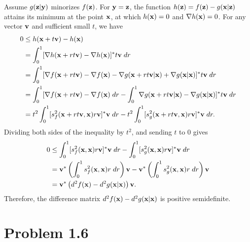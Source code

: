 \documentclass{scrartcl}
\begin{document}
Assume $g(\mathbf{z}|\mathbf{y})$ minorizes $f(\mathbf{z})$. For $\mathbf{y}=\mathbf{z}$, the
function $h(\mathbf{z})=f(\mathbf{z})-g(\mathbf{x}|\mathbf{z})$ attains its minimum at the
point $\mathbf{x}$, at which $h(\mathbf{x})=0$ and $\nabla h(\mathbf{x}) = 0$.
For any vector $\mathbf{v}$ and sufficient small $t$, we have
\begin{align}
\begin{split}
0 & \le h(\mathbf{x}+t\mathbf{v})-h(\mathbf{x}) \\
& = \int_0^1 [\nabla h(\mathbf{x}+rt\mathbf{v})-\nabla h(\mathbf{x})]^*t\mathbf{v} \; dr \\
& = \int_0^1 [\nabla f(\mathbf{x}+rt\mathbf{v}) -\nabla f(\mathbf{x})
-\nabla g(\mathbf{x}+rt\mathbf{v}|\mathbf{x})+\nabla g(\mathbf{x}|\mathbf{x})]^*t\mathbf{v} \; dr \\
& = \int_0^1 [\nabla f(\mathbf{x}+rt\mathbf{v}) -\nabla f(\mathbf{x}) \; dr -
\int_0^1\nabla g(\mathbf{x}+rt\mathbf{v}|\mathbf{x})-\nabla g(\mathbf{x}|\mathbf{x})]^*t\mathbf{v}\;dr \\
& = t^2 \int_0^1 [s_f^2(\mathbf{x}+rt\mathbf{v},\mathbf{x})r\mathbf{v}]^*\mathbf{v} \; dr -
t^2 \int_0^1 [s_g^2(\mathbf{x}+rt\mathbf{v},\mathbf{x})r\mathbf{v}]^*\mathbf{v} \; dr .
\end{split}
\end{align}
Dividing both sides of the inequality by $t^2$, and sending $t$ to 0 gives
\begin{align}
\begin{split}
0 & \le \int_0^1 [s_f^2(\mathbf{x},\mathbf{x})r\mathbf{v}]^*\mathbf{v} \; dr -
\int_0^1 [s_g^2(\mathbf{x},\mathbf{x})r\mathbf{v}]^*\mathbf{v} \; dr \\
& = \mathbf{v}^* \left( \int_0^1 s_f^2(\mathbf{x},\mathbf{x}) r \; dr \right)\mathbf{v}
- \mathbf{v}^* \left( \int_0^1 s_g^2(\mathbf{x},\mathbf{x}) r \; dr \right)\mathbf{v} \\
& = \mathbf{v}^* \left( d^2f(\mathbf{x}) - d^2g(\mathbf{x}|\mathbf{x}) \right) \mathbf{v} .
\end{split}
\end{align}
Therefore, the difference matrix $d^2f(\mathbf{x}) - d^2g(\mathbf{x}|\mathbf{x})$ is
positive semidefinite.


\section*{Problem 1.6}
\end{document}
